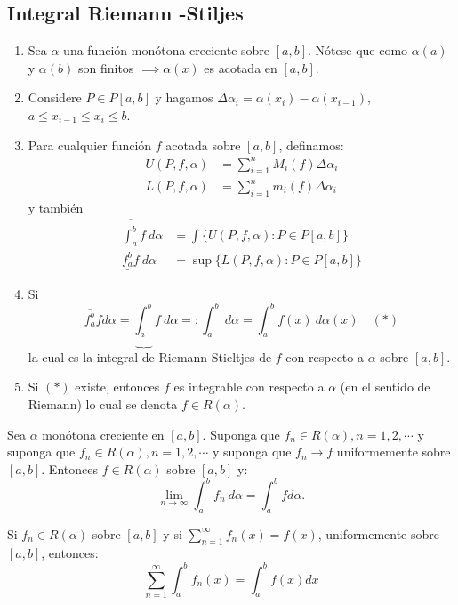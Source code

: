 \subsection{Integral Riemann -Stiljes}
\begin{enumerate}
	\item Sea $\alpha$ una función monótona creciente sobre $[a,b]$. Nótese que como $\alpha(a)$ y $\alpha(b)$ son finitos $\implies \alpha(x)$ es acotada en $[a,b]$. 
	\item Considere $P\in P[a,b]$ y hagamos $\Delta \alpha_i=\alpha(x_i)-\alpha(x_{i-1})$, $a\leq x_{i-1}\leq x_i\leq b$. 
	\item Para cualquier función $f$ acotada sobre $[a,b]$, definamos: 
	\begin{align*}
		U(P,f,\alpha) &= \sum_{i=1}^{n} M_i(f)\Delta \alpha_i\\
		L(P,f,\alpha) &= \sum_{i=1}^{n}m_i(f) \Delta\alpha_i
	 	\end{align*}
 	y también 
 	\begin{align*}
 		\overline{\int_a^b}f \ d\alpha &= \int\{U(P,f,\alpha ): P\in P[a,b]\}\\
 		\underline{f_a^b}f\ d\alpha &= \sup\{L(P,f,\alpha): P\in P[a,b]\} 
 	\end{align*}
 	\item Si 
 	$$\overline{f_a^b}fd\alpha =\underbrace{\int_a^b}f\ d\alpha =: \int_a^b \ d\alpha = \int_a^b f(x)\ d \alpha (x) \quad (*)$$
 	la cual es la integral de Riemann-Stieltjes de $f$ con respecto a $\alpha$ sobre $[a,b]$. 
 	\item Si $(*)$ existe, entonces $f$ es integrable con respecto a $\alpha$ (en el sentido de Riemann) lo cual se denota $f\in R(\alpha)$. 
\end{enumerate}

\begin{teorema}
	Sea $\alpha$ monótona creciente en $[a,b]$. Suponga que $f_n\in R(\alpha), n=1,2,\cdots$ y suponga que $f_n\in R(\alpha), n=1,2,\cdots$ y suponga que $f_n\to f$ uniformemente sobre $[a,b]$. Entonces $f\in R(\alpha)$ sobre $[a,b]$ y: 
	$$\lim_{n\to\infty} \int_a^b f_n \ d\alpha =\int_a^b fd\alpha.$$
\end{teorema}

\begin{corolario}
	Si $f_n\in R(\alpha)$ sobre $[a,b]$ y si $\sum_{n=1}^{\infty}f_n(x)=f(x)$, uniformemente sobre $[a,b]$, entonces: 
	$$\sum_{n=1}^{\infty}\int_a^b f_n(x)=\int_a^b f(x)dx$$
\end{corolario}

